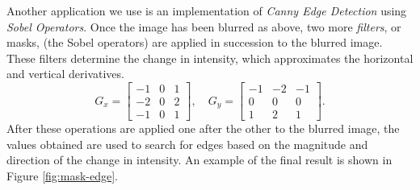 \documentclass[addpoints]{exam}
\begin{document}
Another application we use is an implementation of \textit{Canny Edge Detection} using \textit{Sobel Operators}. Once the image has been blurred as above, two more \textit{filters}, or masks, (the Sobel operators) are applied in succession to the blurred image. These filters determine the change in intensity, which approximates the horizontal and vertical derivatives.
\[
  G_x =   \left[
    \begin{array}{ccc}
      -1 & 0 & 1\\
      -2 & 0 & 2\\
      -1 & 0 & 1
    \end{array}
      \right], \quad
  G_y =   \left[
    \begin{array}{ccc}
      -1 & -2 & -1\\
      0 & 0 & 0\\
      1 & 2 & 1
    \end{array}    
  \right].
\]
After these operations are applied one after the other to the blurred image, the values obtained are used to search for edges based on the magnitude and direction of the change in intensity. An example of the final result is shown in Figure \ref{fig:mask-edge}.
\end{document}
